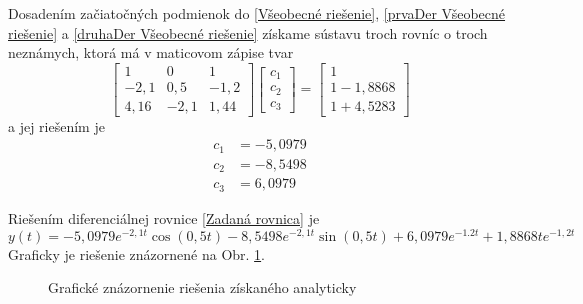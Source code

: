\documentclass[a4paper, 10pt, ]{article}
\begin{document}
Dosadením začiatočných podmienok do \eqref{Všeobecné riešenie}, \eqref{prvaDer Všeobecné riešenie} a \eqref{druhaDer Všeobecné riešenie} získame sústavu troch rovníc o troch neznámych, ktorá má v maticovom zápise tvar
\begin{equation}
	\begin{bmatrix}
		   1 &    0 &    1 \\
		-2,1 &  0,5 & -1,2 \\
		4,16 & -2,1 & 1,44
	\end{bmatrix}
	\begin{bmatrix}
		c_1 \\
		c_2 \\
		c_3
	\end{bmatrix}
	=
	\begin{bmatrix}
		1 \\
		1-1,8868 \\
		1+4,5283
	\end{bmatrix}
\end{equation}
a jej riešením je
\begin{subequations}
	\begin{align}
		c_1 &= -5,0979\\
		c_2 &= -8,5498\\
		c_3 &=  6,0979
	\end{align}
\end{subequations}




Riešením diferenciálnej rovnice \eqref{Zadaná rovnica} je
\begin{equation}
	y(t) = -5,0979 e^{-2,1t} \cos(0,5t)  -8,5498 e^{-2,1t} \sin(0,5t) + 6,0979 e^{-1.2t} + 1,8868 t e^{-1,2 t}
\end{equation}
Graficky je riešenie znázornené na Obr. \ref{Grafické znázornenie riešenia získaného analyticky}.


\begin{figure}[!ht]
	\centering


	\caption{Grafické znázornenie riešenia získaného analyticky}
	\label{Grafické znázornenie riešenia získaného analyticky}
\end{figure}
\end{document}
